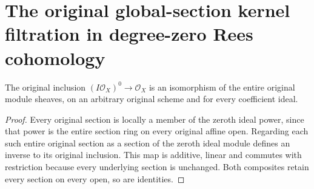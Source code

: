 \section{The original global-section kernel filtration in degree-zero Rees cohomology}

\begin{lemma}
\label{lem:fibre-ideal-power-zero-module-iso}
\leanok
The original inclusion $(I\mathcal O_X)^0\to\mathcal O_X$ is an
isomorphism of the entire original module sheaves, on an arbitrary
original scheme and for every coefficient ideal.
\end{lemma}
\begin{proof}
Every original section is locally a member of the zeroth ideal power,
since that power is the entire section ring on every original affine
open. Regarding each such entire original section as a section of the
zeroth ideal module defines an inverse to its original inclusion. This
map is additive, linear and commutes with restriction because every
underlying section is unchanged.
Both composites retain every section on every open, so are identities.
\end{proof}

